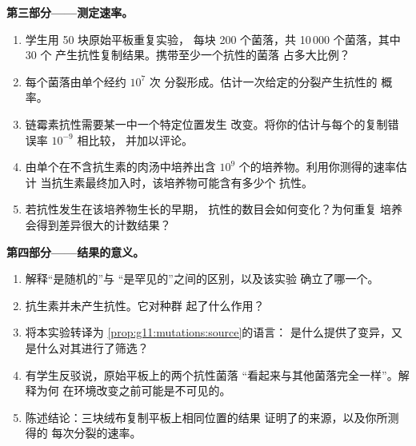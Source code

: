 \begin{problem}
\medskip
\noindent\textbf{第三部分——测定速率。}
\begin{enumerate}[resume]
  \item 学生用 50 块原始平板重复实验，
        每块 200 个菌落，共 10\,000 个菌落，其中 30 个
        产生抗性复制结果。携带至少一个抗性的菌落
        占多大比例？
  \item 每个菌落由单个经约 $10^7$ 次
        分裂形成。估计一次给定的分裂产生抗性的
        概率。
  \item 链霉素抗性需要某一中一个特定位置发生
        改变。将你的估计与每个的复制错误率
        $10^{-9}$ 相比较，
        并加以评论。
  \item 由单个在不含抗生素的肉汤中培养出含
        $10^9$ 个的培养物。利用你测得的速率估计
        当抗生素最终加入时，该培养物可能含有多少个
        抗性。
  \item 若抗性发生在该培养物生长的早期，
        抗性的数目会如何变化？为何重复
        培养会得到差异很大的计数结果？
\end{enumerate}

\medskip
\noindent\textbf{第四部分——结果的意义。}
\begin{enumerate}[resume]
  \item 解释“是随机的”与
        “是罕见的”之间的区别，以及该实验
        确立了哪一个。
  \item 抗生素并未产生抗性。它对种群
        起了什么作用？
  \item 将本实验转译为
        \cref{prop:g11:mutations:source}的语言：
        是什么提供了变异，又是什么对其进行了筛选？
  \item 有学生反驳说，原始平板上的两个抗性菌落
        “看起来与其他菌落完全一样”。解释为何
        在环境改变之前可能是不可见的。
  \item 陈述结论：三块绒布复制平板上相同位置的结果
        证明了的来源，以及你所测得的
        每次分裂的速率。
\end{enumerate}
\end{problem}
